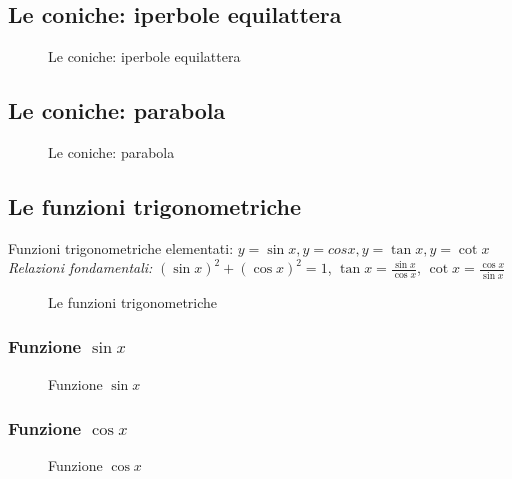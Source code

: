 \subsection{Le coniche: iperbole equilattera}
\begin{figure}[!ht]
	\centering
	\caption{Le coniche: iperbole equilattera}
\end{figure}
\subsection{Le coniche: parabola}
\begin{figure}[!ht]
	\centering
	\caption{Le coniche: parabola}
\end{figure}\newpage
\subsection{Le funzioni trigonometriche}
Funzioni trigonometriche elementati:
$y=\sin x, y=cos x, y=\tan x, y=\cot x$\\
\textit{Relazioni fondamentali:} $(\sin x)^2+(\cos x)^2=1$, $\tan x=\frac{\sin
x}{\cos x}$, $\cot x=\frac{\cos x}{\sin x}$
\begin{figure}[!ht]
	\centering
	\caption{Le funzioni trigonometriche}
\end{figure}
\subsubsection{Funzione $\sin x$}
\begin{figure}[!ht]
	\centering
	\caption{Funzione $\sin x$}
\end{figure}\newpage
\subsubsection{Funzione $\cos x$}
\begin{figure}[!ht]
	\centering
	\caption{Funzione $\cos x$}
\end{figure}

